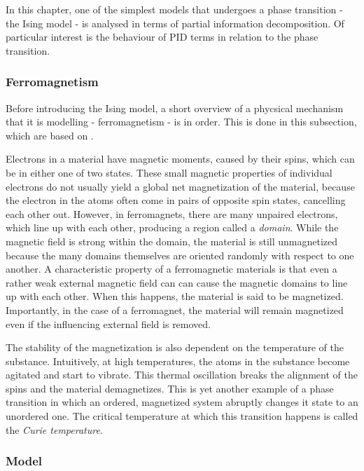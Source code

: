 \documentclass[12pt]{article}
\begin{document}
In this chapter, one of the simplest models that undergoes a phase transition - the Ising model - is analysed in terms of partial information decomposition. Of particular interest is the behaviour of PID terms in relation to the phase transition.

\subsubsection{Ferromagnetism}

Before introducing the Ising model, a short overview of a phycsical mechanism that it is modelling - ferromagnetism - is in order. This is done in this subsection, which are based on \cite{memory-systems-cache-ram}.

Electrons in a material have magnetic moments, caused by their spins, which can be in either one of two states. These small magnetic properties of individual electrons do not usually yield a global net magnetization of the material, because the electron in the atoms often come in pairs of opposite spin states, cancelling each other out. However, in ferromagnets, there are many unpaired electrons, which line up with each other, producing a region called a \textit{domain}. While the magnetic field is strong within the domain, the material is still unmagnetized because the many domains themselves are oriented randomly with respect to one another. A characteristic property of a ferromagnetic materials is that even a rather weak external magnetic field can can cause the magnetic domains to line up with each other. When this happens, the material is said to be magnetized. Importantly, in the case of a ferromagnet, the material will remain magnetized even if the influencing external field is removed. 

The stability of the magnetization is also dependent on the temperature of the substance. Intuitively, at high temperatures, the atoms in the substance become agitated and start to vibrate. This thermal oscillation breaks the alignment of the spins and the material demagnetizes. This is yet another example of a phase transition in which an ordered, magnetized system abruptly changes it state to an unordered one. The critical temperature at which this transition happens is called the \textit{Curie temperature}.


\subsubsection{Model} 
\end{document}
